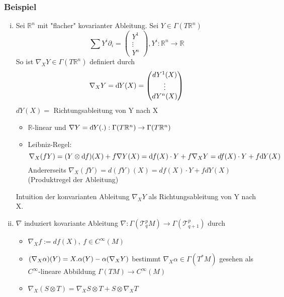 \subsubsection{Beispiel}
\label{ssub:28}
\begin{enumerate}[(i)]
\item Sei $\mathds{R}^n$ mit "flacher" kovarianter Ableitung. Sei $Y\in\Gamma(T\mathds{R}^n)$
\[
\sum Y^i \partial_i = \begin{pmatrix}Y^1\\ \vdots\\Y^n\end{pmatrix}, Y^i:\mathds{R}^n\to\mathds{R}
\]
So ist $\nabla_X Y\in \Gamma(T\mathds{R}^n)$ definiert durch 
\[
\nabla_X Y=\mathrm{d}\mkern-1.0mu Y(X)=\begin{pmatrix}dY^1(X)\\\vdots\\dY^n(X)\\\end{pmatrix}
\]
$dY(X) = $ Richtungsableitung von Y nach X 
\begin{itemize}
\item $\mathds{R}$-linear und $\nabla Y=\mathrm{d}\mkern-1.0mu Y(.):\Gamma(T\mathbb{R}^n)\to\Gamma(T\mathbb{R}^n)$
\item Leibniz-Regel: 
\[
\nabla_X(fY)=(Y\otimes \mathrm{d}\mkern-1.0mu f)(X) + f\nabla  Y(X) = \mathrm{d}\mkern-1.0mu f(X)\cdot Y + f\nabla_X Y = df(X)\cdot Y + f\mathrm{d}\mkern-1.0mu Y(X)
\]
Andererseits $\nabla_X(fY)=d(fY)(X)=df(X)\cdot Y+fdY(X)$ (Produktregel der Ableitung)
\end{itemize}
Intuition der konvarianten Ableitung $\nabla_XY$ als Richtungsableitung von Y nach X. 
\item $\nabla$ induziert kovariante Ableitung $\nabla:\Gamma(\mathcal{T}^p_qM)\to\Gamma(\mathcal{T}^p_{q+1})$ durch 
\begin{itemize}
\item $\nabla_Xf:=df(X),\ f\in C^\infty(M)$
\item $(\nabla_X\alpha)(Y)=X.\alpha(Y) - \alpha(\nabla_X Y)$ bestimmt $\nabla_X\alpha\in\Gamma(T^*M)$ gesehen als $C^\infty$-lineare Abbildung $\Gamma(TM)\to C^\infty(M)$
\item $\nabla_X (S\otimes T)=\nabla_X S\otimes T + S\otimes\nabla_X T$
\end{itemize}
\end{enumerate}

